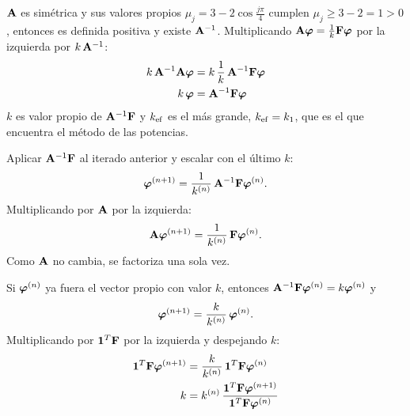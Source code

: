 
$\mathbf{A}$ es simétrica y sus valores propios $\mu_j = 3 - 2\cos\frac{j\pi}{4}$ cumplen
$\mu_j \ge 3 - 2 = 1 > 0$, entonces es definida positiva y existe $\mathbf{A}^{-1}$.
Multiplicando $\mathbf{A}\bm{\varphi} = \frac1k\mathbf{F}\bm{\varphi}$ por la izquierda por $k\,\mathbf{A}^{-1}$:
\begin{align*}
	k\,\mathbf{A}^{-1}\mathbf{A}\bm{\varphi} &= k\,\frac1k\,\mathbf{A}^{-1}\mathbf{F}\bm{\varphi}\\
	k\,\bm{\varphi} &= \mathbf{A}^{-1}\mathbf{F}\bm{\varphi}
\end{align*}
$k$ es valor propio de $\mathbf{A}^{-1}\mathbf{F}$ y $k_{\mathrm{ef}}$ es el más grande, $k_{\mathrm{ef}} = k_1$, que es el que encuentra
el método de las potencias.

Aplicar $\mathbf{A}^{-1}\mathbf{F}$ al iterado anterior y escalar con el último $k$:
\[
\bm{\varphi}^{(n+1)} = \frac{1}{k^{(n)}}\,\mathbf{A}^{-1}\mathbf{F}\bm{\varphi}^{(n)} .
\]
Multiplicando por $\mathbf{A}$ por la izquierda:
\[
\mathbf{A}\bm{\varphi}^{(n+1)} = \frac{1}{k^{(n)}}\,\mathbf{F}\bm{\varphi}^{(n)} .
\]
Como $\mathbf{A}$ no cambia, se factoriza una sola vez.

Si $\bm{\varphi}^{(n)}$ ya fuera el vector propio con valor $k$, entonces
$\mathbf{A}^{-1}\mathbf{F}\bm{\varphi}^{(n)} = k\bm{\varphi}^{(n)}$ y
\[
\bm{\varphi}^{(n+1)} = \frac{k}{k^{(n)}}\,\bm{\varphi}^{(n)} .
\]
Multiplicando por $\bm{1}^T\mathbf{F}$ por la izquierda y despejando $k$:
\begin{align*}
	\bm{1}^T\mathbf{F}\bm{\varphi}^{(n+1)} &= \frac{k}{k^{(n)}}\,\bm{1}^T\mathbf{F}\bm{\varphi}^{(n)}\\
	k &= k^{(n)}\,\frac{\bm{1}^T\mathbf{F}\bm{\varphi}^{(n+1)}}{\bm{1}^T\mathbf{F}\bm{\varphi}^{(n)}}
\end{align*}



